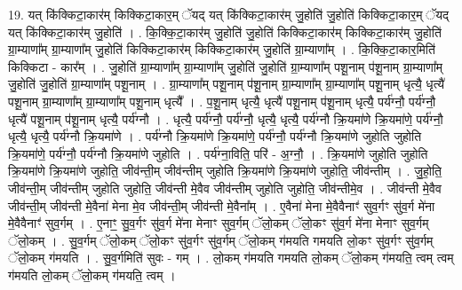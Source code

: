 \documentclass[17pt]{extarticle}
\begin{document}
19. यत् कि॑क्किटा॒कार॑म् किक्किटा॒कार॒म् ॅयद् यत् कि॑क्किटा॒कार॑म् जु॒होति॑ जु॒होति॑ किक्किटा॒कार॒म् ॅयद् यत् कि॑क्किटा॒कार॑म् जु॒होति॑ । . कि॒क्कि॒टा॒कार॑म् जु॒होति॑ जु॒होति॑ किक्किटा॒कार॑म् किक्किटा॒कार॑म् जु॒होति॑ ग्रा॒म्याणा᳚म् ग्रा॒म्याणा᳚म् जु॒होति॑ किक्किटा॒कार॑म् किक्किटा॒कार॑म् जु॒होति॑ ग्रा॒म्याणा᳚म् । . कि॒क्कि॒टा॒कार॒मिति॑ किक्किटा - कार᳚म् । . जु॒होति॑ ग्रा॒म्याणा᳚म् ग्रा॒म्याणा᳚म् जु॒होति॑ जु॒होति॑ ग्रा॒म्याणा᳚म् पशू॒नाम् प॑शू॒नाम् ग्रा॒म्याणा᳚म् जु॒होति॑ 
जु॒होति॑ ग्रा॒म्याणा᳚म् पशू॒नाम् । . ग्रा॒म्याणा᳚म् पशू॒नाम् प॑शू॒नाम् ग्रा॒म्याणा᳚म् ग्रा॒म्याणा᳚म् पशू॒नाम् धृत्यै॒ धृत्यै॑ पशू॒नाम् ग्रा॒म्याणा᳚म् ग्रा॒म्याणा᳚म् पशू॒नाम् धृत्यै᳚ । . प॒शू॒नाम् धृत्यै॒ धृत्यै॑ पशू॒नाम् प॑शू॒नाम् धृत्यै॒ पर्य॑ग्नौ॒ पर्य॑ग्नौ॒ धृत्यै॑ पशू॒नाम् प॑शू॒नाम् धृत्यै॒ पर्य॑ग्नौ । . धृत्यै॒ पर्य॑ग्नौ॒ पर्य॑ग्नौ॒ धृत्यै॒ धृत्यै॒ पर्य॑ग्नौ क्रि॒यमा॑णे क्रि॒यमा॑णे॒ पर्य॑ग्नौ॒ धृत्यै॒ धृत्यै॒ पर्य॑ग्नौ क्रि॒यमा॑णे । . पर्य॑ग्नौ क्रि॒यमा॑णे क्रि॒यमा॑णे॒ पर्य॑ग्नौ॒ पर्य॑ग्नौ क्रि॒यमा॑णे जुहोति जुहोति क्रि॒यमा॑णे॒ पर्य॑ग्नौ॒ पर्य॑ग्नौ क्रि॒यमा॑णे जुहोति । . पर्य॑ग्ना॒विति॒ परि॑ - अ॒ग्नौ॒ । . क्रि॒यमा॑णे जुहोति जुहोति क्रि॒यमा॑णे क्रि॒यमा॑णे जुहोति॒ जीव॑न्ती॒म् जीव॑न्तीम् जुहोति क्रि॒यमा॑णे क्रि॒यमा॑णे जुहोति॒ जीव॑न्तीम् । . जु॒हो॒ति॒ जीव॑न्ती॒म् जीव॑न्तीम् जुहोति जुहोति॒ जीव॑न्ती मे॒वैव जीव॑न्तीम् जुहोति जुहोति॒ जीव॑न्तीमे॒व । . जीव॑न्ती मे॒वैव जीव॑न्ती॒म् जीव॑न्ती मे॒वैना॑ मेना मे॒व जीव॑न्ती॒म् जीव॑न्ती मे॒वैना᳚म् । . ए॒वैना॑ मेना मे॒वैवैनाꣳ॑ सुव॒र्गꣳ सु॑व॒र्ग मे॑ना मे॒वैवैनाꣳ॑ सुव॒र्गम् । . ए॒नाꣳ॒॒ सु॒व॒र्गꣳ सु॑व॒र्ग मे॑ना मेनाꣳ सुव॒र्गम् ॅलो॒कम् ॅलो॒कꣳ सु॑व॒र्ग मे॑ना मेनाꣳ सुव॒र्गम् ॅलो॒कम् । . सु॒व॒र्गम् ॅलो॒कम् ॅलो॒कꣳ सु॑व॒र्गꣳ सु॑व॒र्गम् ॅलो॒कम् ग॑मयति गमयति लो॒कꣳ सु॑व॒र्गꣳ सु॑व॒र्गम् ॅलो॒कम् ग॑मयति । . सु॒व॒र्गमिति॑ सुवः - गम् । . लो॒कम् ग॑मयति गमयति लो॒कम् ॅलो॒कम् ग॑मयति॒ त्वम् त्वम् ग॑मयति लो॒कम् ॅलो॒कम् ग॑मयति॒ त्वम् । \newline
\end{document}
